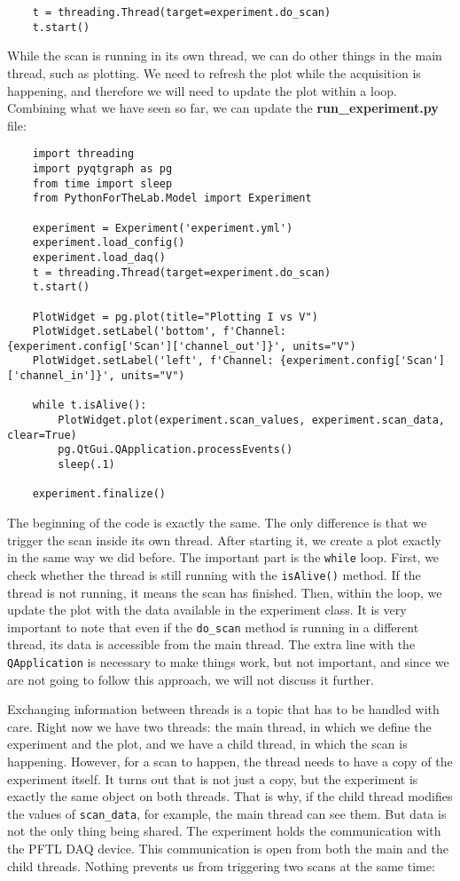 \begin{verbatim}
    t = threading.Thread(target=experiment.do_scan)
    t.start()
\end{verbatim}

While the scan is running in its own thread, we can do other things in the main thread, such as plotting. We need to refresh the plot while the acquisition is happening, and therefore we will need to update the plot within a loop. Combining what we have seen so far, we can update the \textbf{run\_experiment.py} file:

\begin{verbatim}
    import threading
    import pyqtgraph as pg
    from time import sleep
    from PythonForTheLab.Model import Experiment

    experiment = Experiment('experiment.yml')
    experiment.load_config()
    experiment.load_daq()
    t = threading.Thread(target=experiment.do_scan)
    t.start()

    PlotWidget = pg.plot(title="Plotting I vs V")
    PlotWidget.setLabel('bottom', f'Channel: {experiment.config['Scan']['channel_out']}', units="V")
    PlotWidget.setLabel('left', f'Channel: {experiment.config['Scan']['channel_in']}', units="V")

    while t.isAlive():
        PlotWidget.plot(experiment.scan_values, experiment.scan_data, clear=True)
        pg.QtGui.QApplication.processEvents()
        sleep(.1)

    experiment.finalize()
\end{verbatim}

The beginning of the code is exactly the same. The only difference is that we trigger the scan inside its own thread. After starting it, we create a plot exactly in the same way we did before. The important part is the \texttt{while} loop. First, we check whether the thread is still running with the \texttt{isAlive()} method. If the thread is not running, it means the scan has finished. Then, within the loop, we update the plot with the data available in the experiment class. It is very important to note that even if the \texttt{do\_scan} method is running in a different thread, its data is accessible from the main thread. The extra line with the \texttt{QApplication} is necessary to make things work, but not important, and since we are not going to follow this approach, we will not discuss it further.

Exchanging information between threads is a topic that has to be handled with care. Right now we have two threads: the main thread, in which we define the experiment and the plot, and we have a child thread, in which the scan is happening. However, for a scan to happen, the thread needs to have a copy of the experiment itself. It turns out that is not just a copy, but the experiment is exactly the same object on both threads. That is why, if the child thread modifies the values of \texttt{scan\_data}, for example, the main thread can see them. But data is not the only thing being shared. The experiment holds the communication with the {PFTL DAQ} device. This communication is open from both the main and the child threads. Nothing prevents us from triggering two scans at the same time:

